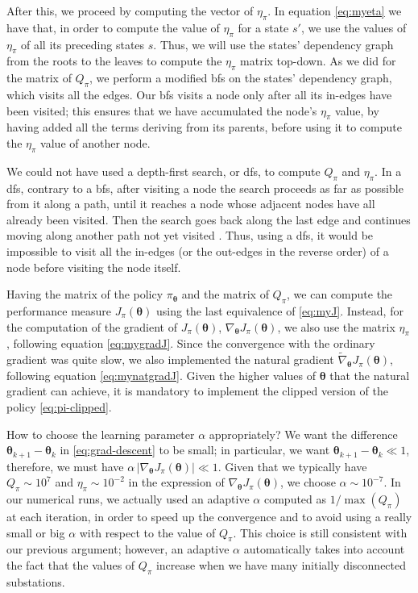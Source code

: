After this, we proceed by computing the vector of $\eta_\pi$. In equation \eqref{eq:myeta} we have that, in order to compute the value of $\eta_\pi$ for a state $s'$, we use the values of $\eta_\pi$ of all its preceding states $s$. Thus, we will use the states' dependency graph from the roots to the leaves to compute the $\eta_\pi$ matrix top-down. As we did for the matrix of $Q_\pi$, we perform a modified \acrshort{bfs} on the states' dependency graph, which visits all the edges. Our \acrshort{bfs} visits a node only after all its in-edges have been visited; this ensures that we have accumulated the node's $\eta_\pi$ value, by having added all the terms deriving from its parents, before using it to compute the $\eta_\pi$ value of another node.

We could not have used a depth-first search, or \acrshort{dfs}, to compute $Q_\pi$ and $\eta_\pi$. In a \acrshort{dfs}, contrary to a \acrshort{bfs}, after visiting a node the search proceeds as far as possible from it along a path, until it reaches a node whose adjacent nodes have all already been visited. Then the search goes back along the last edge and continues moving along another path not yet visited \cite{Montresor2014}. Thus, using a \acrshort{dfs}, it would be impossible to visit all the in-edges (or the out-edges in the reverse order) of a node before visiting the node itself.

Having the matrix of the policy $\pi_{\boldsymbol \theta}$ and the matrix of $Q_\pi$, we can compute the performance measure $J_\pi (\boldsymbol \theta)$ using the last equivalence of \eqref{eq:myJ}. Instead, for the computation of the gradient of $J_\pi (\boldsymbol \theta)$, $\nabla_{\boldsymbol \theta} J_\pi (\boldsymbol \theta)$, we also use the matrix $\eta_\pi$, following equation \eqref{eq:mygradJ}. Since the convergence with the ordinary gradient was quite slow, we also implemented the natural gradient $\widetilde \nabla_{\boldsymbol \theta} J_\pi (\boldsymbol \theta)$, following equation \eqref{eq:mynatgradJ}. Given the higher values of $\boldsymbol \theta$ that the natural gradient can achieve, it is mandatory to implement the clipped version of the policy \eqref{eq:pi-clipped}.

How to choose the learning parameter $\alpha$ appropriately? We want the difference $\boldsymbol \theta_{k+1} - \boldsymbol \theta_k$ in \eqref{eq:grad-descent} to be small; in particular, we want $\boldsymbol \theta_{k+1} - \boldsymbol \theta_k \ll 1$, therefore, we must have $\alpha \, |\nabla_{\boldsymbol \theta} J_\pi (\boldsymbol \theta)| \ll 1$. Given that we typically have $Q_\pi \sim 10^7$ and $\eta_\pi \sim 10^{-2}$ in the expression of $\nabla_{\boldsymbol \theta} J_\pi (\boldsymbol \theta)$, we choose $\alpha \sim 10^{-7}$. In our numerical runs, we actually used an adaptive $\alpha$ computed as $1 / \max(Q_\pi)$ at each iteration, in order to speed up the convergence and to avoid using a really small or big $\alpha$ with respect to the value of $Q_\pi$. This choice is still consistent with our previous argument; however, an adaptive $\alpha$ automatically takes into account the fact that the values of $Q_\pi$ increase when we have many initially disconnected substations.


